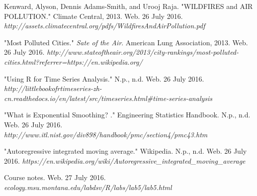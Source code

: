 \documentclass[10pt]{article}
\begin{document}
\begin{thebibliography}{99}
  Kenward, Alyson, Dennis Adams-Smith, and Urooj Raja. "WILDFIRES and AIR POLLUTION." Climate Central, 2013. Web. 26 July 2016. \textit{http://assets.climatecentral.org/pdfs/WildfiresAndAirPollution.pdf}
 
  "Most Polluted Cities." \textit{Sate of the Air}. American Lung Association, 2013. Web. 26 July 2016. \textit{http://www.stateoftheair.org/2013/city-rankings/most-polluted-cities.html?referrer=https://en.wikipedia.org/}
 
 
 
  "Using R for Time Series Analysis." N.p., n.d. Web. 26 July 2016. \textit{http://littlebookofrtimeseries-zh-cn.readthedocs.io/en/latest/src/timeseries.html\#time-series-analysis}
 
  "What is Exponential Smoothing? ." Engineering Statistics Handbook. N.p., n.d. Web. 26 July 2016. \textit{http://www.itl.nist.gov/div898/handbook/pmc/section4/pmc43.htm}
 
  "Autoregressive integrated moving average." Wikipedia. N.p., n.d. Web. 26 July 2016. \textit{https://en.wikipedia.org/wiki/Autoregressive\_integrated\_moving\_average}
 
 
Course notes. Web. 27 July 2016.
\textit{ecology.msu.montana.edu/labdsv/R/labs/lab5/lab5.html}
 \end{thebibliography}
\end{document}
